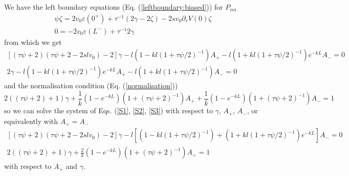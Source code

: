 \documentclass[pre,aps,superscriptaddress,nofootinbib]{revtex4}
\begin{document}
We have the left boundary equations (Eq. (\ref{leftboundary:biased})) for $P_{\alpha\overline{\alpha}}$
\begin{eqnarray}
\psi \zeta = 2 v_0 \varepsilon(0^+) + \tau^{-1} (2 \gamma - 2 \zeta) - 2 s v_0 \partial_r V(0) \zeta\\
0 = - 2 v_0 \varepsilon(L^-) + \tau^{-1} 2 \gamma
\end{eqnarray}
from which we get
\begin{eqnarray}
\label{S1}
\left[(\tau\psi + 2)(\tau\psi + 2 - 2 s l v_0) - 2\right] \gamma - l \left(1 - kl  (1 + \tau\psi/2)^{-1}\right) A_+ - l \left(1 + kl(1 + \tau\psi/2)^{-1}\right) e^{-kL} A_- = 0\\
\label{S2}
2 \gamma - l \left(1 - kl (1 + \tau\psi/2)^{-1}\right) e^{-kL} A_+ - l \left(1 + kl (1 + \tau\psi/2)^{-1}\right) A_- = 0
\end{eqnarray}
and the normalisation condition (Eq. (\ref{normalisation}))
\begin{equation}
2((\tau\psi + 2) + 1) \gamma + \frac{1}{k} \left(1 - e^{-kL}\right)\left(1 + (\tau\psi + 2)^{-1}\right) A_+ + \frac{1}{k} \left(1 - e^{-kL}\right)\left(1 + (\tau\psi + 2)^{-1}\right) A_- = 1
\label{S3}
\end{equation}
so we can solve the system of Eqs. (\ref{S1}, \ref{S2}, \ref{S3}) with respect to $\gamma$, $A_+$, $A_-$, or equivalently with $A_+ = A_-$
\begin{eqnarray}
\label{S01}
\left[(\tau\psi + 2)(\tau\psi + 2 - 2 s l v_0) - 2\right] \gamma - l \left[\left(1 - kl  (1 + \tau\psi/2)^{-1}\right) + \left(1 + kl(1 + \tau\psi/2)^{-1}\right) e^{-kL}\right] A_- = 0\\
\label{S02}
2((\tau\psi + 2) + 1) \gamma + \frac{2}{k} \left(1 - e^{-kL}\right)\left(1 + (\tau\psi + 2)^{-1}\right) A_+ = 1
\end{eqnarray}
with respect to $A_+$ and $\gamma$.\\
\end{document}
